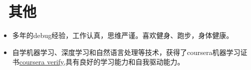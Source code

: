 \documentclass{resume}
\begin{document}



\section{\faInfo\ 其他}\normalsize
\begin{itemize}
\item {多年的debug经验，工作认真，思维严谨。喜欢健身、跑步，身体健康。}
  \item {自学机器学习、深度学习和自然语言处理等技术，获得了coursera机器学习证书}\href{https://www.coursera.org/account/accomplishments/verify/NFCZEBTZ5T4L}{coursera verify}{,具有良好的学习能力和自我驱动能力。}
\end{itemize}

%
%
\end{document}
